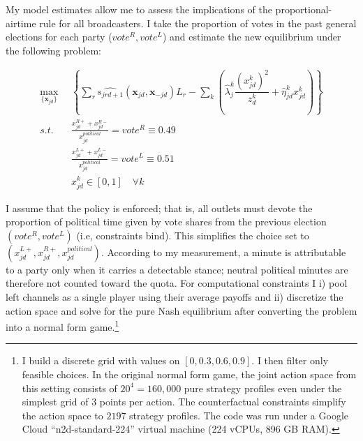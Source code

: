 \documentclass[12pt]{article}
\begin{document}
My model estimates allow me to assess the  implications of the proportional-airtime rule for all broadcasters.  I take the proportion of votes in the past general elections for each party ($vote^R,vote^L$) and estimate the new equilibrium under the following problem: 




\begin{equation}\label{eq:payoffs2}
	\begin{aligned}
		\max_{\{\bm{x}_{jd}\}}   & \left\{   \sum_{r}\widehat{s_{jrd+1}}(\bm{x}_{jd}, \bm{x}_{-jd})L_r - \sum_k \left({\hat{\lambda}_j^k}  \dfrac{(x_{jd}^k)^2}{z_{d}^k} + \hat{{\eta}}_{jd}^k x_{jd}^k \right)  \right\}\\
		s.t.   \quad &   \frac{x_{jd}^{R+} + x_{jd}^{R-} }{x_{jd}^{political}}=vote^R\equiv0.49\\
		&  \frac{x_{jd}^{L+} + x_{jd}^{L-} }{x_{jd}^{political}}= vote^L\equiv0.51\\
		& x_{jd}^k \in [0,1] \quad \forall k
	\end{aligned}
\end{equation} 


I assume that the policy is enforced; that is, all outlets must devote the proportion of political time given by vote shares from the previous election $(vote^R, vote^L)$ (i.e, constraints bind). This simplifies the choice set to $\left( x_{jd}^{L+} ,x_{jd}^{R+} ,x_{jd}^{political}\right)$. According to my measurement, a minute is attributable to a party only when it carries a detectable stance; neutral political minutes are therefore not counted toward the quota. For computational constraints I i) pool left channels as a single player using their average payoffs and ii) discretize the action space and solve for the pure Nash equilibrium after converting the problem into a normal form game.\footnote{ I build a discrete grid with values on $ [0,0.3,0.6,0.9]$. I then filter only feasible choices. In the original normal form game, the joint action space from this setting consists of 	$20^4=160,000$  pure strategy profiles even under the simplest grid of 3 points per action. The counterfactual constraints simplify the action space to $2197$ strategy profiles.  The code was run under a Google Cloud “n2d-standard-224” virtual machine (224 vCPUs, 896 GB RAM).} 

\end{document}
